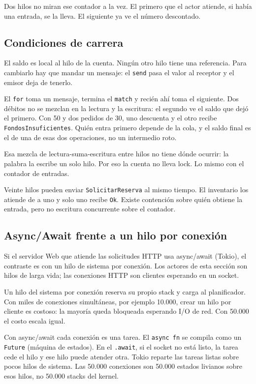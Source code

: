 Dos hilos no miran ese contador a la vez. El primero que el actor
atiende, si había una entrada, se la lleva. El siguiente ya ve el número
descontado.

\subsection{Condiciones de carrera}

El saldo es local al hilo de la cuenta. Ningún otro hilo tiene una
referencia. Para cambiarlo hay que mandar un mensaje: el \texttt{send}
pasa el valor al receptor y el emisor deja de tenerlo.

El \texttt{for} toma un mensaje, termina el \texttt{match} y recién ahí
toma el siguiente. Dos débitos no se mezclan en la lectura y la
escritura: el segundo ve el saldo que dejó el primero. Con 50 y dos
pedidos de 30, uno descuenta y el otro recibe
\texttt{FondosInsuficientes}. Quién entra primero depende de la cola, y
el saldo final es el de una de esas dos operaciones, no un intermedio
roto.

Esa mezcla de lectura-suma-escritura entre hilos no tiene dónde ocurrir:
la palabra la escribe un solo hilo. Por eso la cuenta no lleva lock. Lo
mismo con el contador de entradas.

Veinte hilos pueden enviar \texttt{SolicitarReserva} al mismo tiempo. El
inventario los atiende de a uno y solo uno recibe \texttt{Ok}. Existe
contención sobre quién obtiene la entrada, pero no escritura concurrente
sobre el contador.

\subsection{Async/Await frente a un hilo por conexión}

Si el servidor Web que atiende las solicitudes HTTP usa async/await
(Tokio), el contraste es con un hilo de sistema por conexión. Los
actores de esta sección son hilos de larga vida; las conexiones HTTP son
clientes esperando en un socket.

Un hilo del sistema por conexión reserva su propio stack y carga al
planificador. Con miles de conexiones simultáneas, por ejemplo 10.000,
crear un hilo por cliente es costoso: la mayoría queda bloqueada
esperando I/O de red. Con 50.000 el costo escala igual.

Con async/await cada conexión es una tarea. El \texttt{async fn} se
compila como un \texttt{Future} (máquina de estados). En el
\texttt{.await}, si el socket no está listo, la tarea cede el hilo y
ese hilo puede atender otra. Tokio reparte las tareas listas sobre
pocos hilos de sistema. Las 50.000 conexiones son 50.000 estados
livianos sobre esos hilos, no 50.000 stacks del kernel.

